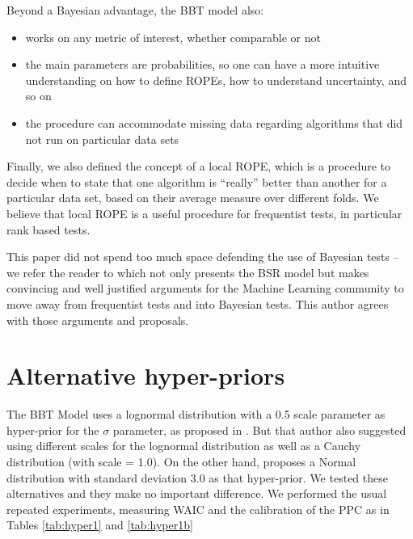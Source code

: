 \documentclass[twoside,11pt,preprint]{article}
\def\tightlist{}
\begin{document}
Beyond a Bayesian advantage, the BBT model also:

\begin{itemize}
\tightlist
\item
  works on any metric of interest, whether comparable or not
\item
  the main parameters are probabilities, so one can have a more
  intuitive understanding on how to define ROPEs, how to understand
  uncertainty, and so on
\item
  the procedure can accommodate missing data regarding algorithms that did not run on particular data sets
\end{itemize}

Finally, we also defined the concept of a local ROPE, which is a
procedure to decide when to state that one algorithm is ``really''
better than another for a particular data set, based on their average
measure over different folds. We believe that local ROPE is a useful
procedure for frequentist tests, in particular rank based tests.

This paper did not spend too much space defending the use of Bayesian
tests -- we refer the reader to \citet{benavoli2017time} which not only
presents the BSR model but makes convincing and well justified
arguments for the Machine Learning community to move away from
frequentist tests and into Bayesian tests. This author
agrees with those arguments and proposals.

\appendix

\hypertarget{alternative-hyper-priors}{%
\section{\texorpdfstring{Alternative hyper-priors \label{test-hyper}}{Alternative hyper-priors }}\label{alternative-hyper-priors}}

The BBT Model uses a lognormal distribution with a 0.5 scale parameter as hyper-prior for the \(\sigma\) parameter, as proposed in \citet{btstan}. But that author also suggested using different scales for the lognormal distribution as well as a Cauchy distribution (with scale = 1.0). On the other hand, \citet{issa2021bayesian} proposes a Normal distribution with standard deviation 3.0 as that hyper-prior. We tested these alternatives and they make no important difference. We performed the usual repeated experiments, measuring WAIC and the calibration of the PPC as in Tables \ref{tab:hyper1} and \ref{tab:hyper1b}
\end{document}
